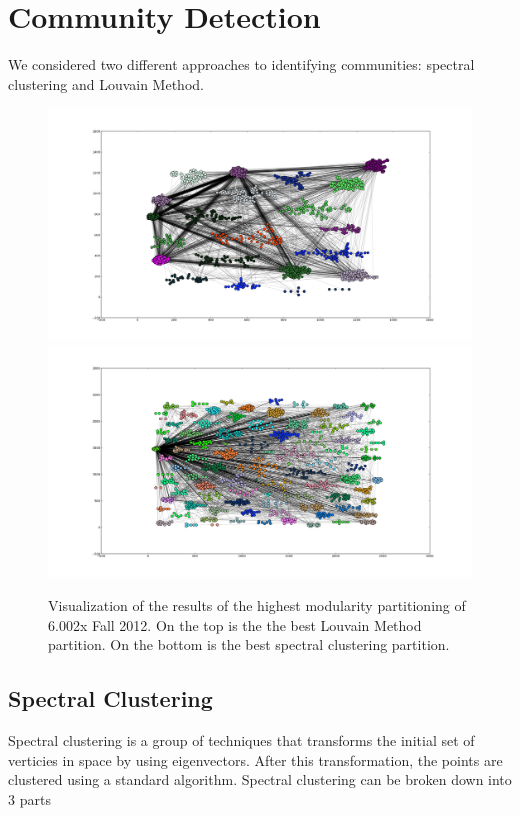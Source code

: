 \section{Community Detection}
We considered two different approaches to identifying communities: spectral clustering and Louvain Method.
\begin{figure}[!htb]
  \centering
  \includegraphics[width=.8\linewidth]{louvain_best.png}
  \includegraphics[width=.8\linewidth]{spectral_best.png}
  \caption{Visualization of the results of the highest modularity partitioning of 6.002x Fall 2012. On the top is the the best Louvain Method partition. On the bottom is the best spectral clustering partition.}
  \label{Louvain_best}
\end{figure}

\subsection{Spectral Clustering}

Spectral clustering is a group of techniques that transforms the initial set of verticies in space by using eigenvectors. After this transformation, the points are clustered using a standard algorithm\cite{2010PhR...486...75F}. Spectral clustering can be broken down into 3 parts

